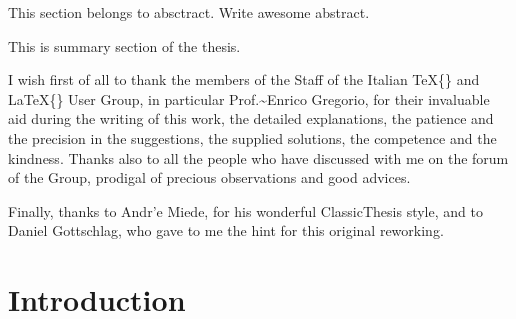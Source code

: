 \documentclass[11pt,a4paper,oneside,openright,titlepage,
  headinclude,footinclude,BCOR=5mm,
  numbers=noenddot,cleardoublepage=empty,
  tablecaptionabove, dottedtoc,
  bibliography=totoc]{scrreprt}
\begin{document}
This section belongs to absctract. Write awesome abstract.
\vfill

\clearpage
{}
This is summary section of the thesis.
\endgroup
\vfill


\begingroup
\let\clearpage\relax
\let\cleardoublepage\relax
\let\cleardoublepage\relax


I wish first of all to thank the members of the Staff of the Italian \TeX\{\} and \LaTeX\{\} User Group, in particular Prof.\textasciitilde{}Enrico Gregorio, for their invaluable aid during the writing of this work, the detailed explanations, the patience and the precision in the suggestions, the supplied solutions, the competence and the kindness. Thanks also to all the people who have discussed with me on the forum of the Group, prodigal of precious observations and good advices.

Finally, thanks to Andr'e Miede, for his wonderful ClassicThesis style, and to Daniel Gottschlag, who gave to me the hint for this original reworking.

\endgroup

\clearpage
{}
{}
\setcounter{tocdepth}{2}
\begingroup 
  \let\clearpage\relax
  \let\cleardoublepage\relax
  \tableofcontents
\endgroup
\markboth{\spacedlowsmallcaps{\contentsname}}
{\spacedlowsmallcaps{\contentsname}} 

\begingroup 
  \let\clearpage\relax
  \let\cleardoublepage\relax
\endgroup

\cleardoublepage


\hypertarget{introduction}{%
\chapter{Introduction}\label{introduction}}
\end{document}
